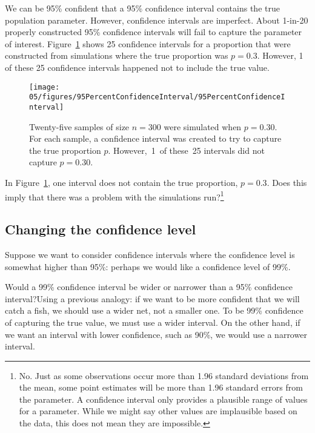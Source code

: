 We can be 95\% confident that a 95\% confidence interval contains the true population parameter.  However, confidence intervals are imperfect. About 1-in-20 properly constructed 95\% confidence intervals will fail to capture the parameter of interest. Figure~\ref{95PercentConfidenceInterval} shows 25 confidence intervals for a proportion that were constructed from simulations where the true proportion was $p = 0.3$. However, 1 of these 25 confidence intervals happened not to include the true value.

\begin{figure}[hht]
   \centering
   \texttt{[image: 05/figures/95PercentConfidenceInterval/95PercentConfidenceInterval]}
   \caption{Twenty-five samples of size $n=300$ were simulated when $p = 0.30$. For each sample, a confidence interval was created to try to capture the true proportion $p$. However,~1~of these~25 intervals did not capture $p = 0.30$.}
   \label{95PercentConfidenceInterval}
\end{figure}

\begin{exercise}
In Figure~\ref{95PercentConfidenceInterval}, one interval does not contain the true proportion, $p = 0.3$. Does this imply that there was a problem with the simulations run?\footnote{No. Just as some observations occur more than 1.96 standard deviations from the mean, some point estimates will be more than 1.96 standard errors from the parameter. A confidence interval only provides a plausible range of values for a parameter. While we might say other values are implausible based on the data, this does not mean they are impossible.}
\end{exercise}


\subsection{Changing the confidence level}
\label{changingTheConfidenceLevelSection}


Suppose we want to consider confidence intervals where the confidence level is somewhat higher than 95\%: perhaps we would like a confidence level of 99\%. 

\begin{example}{Would a 99\% confidence interval be wider or narrower than a 95\% confidence interval?}Using a previous analogy:  if we want to be more confident that we will catch a fish, we should use a wider net, not a smaller one. To be 99\% confidence of capturing the true value, we must use a wider interval.  On the other hand, if we want an interval with lower confidence, such as 90\%, we would use a narrower interval.
\end{example}


